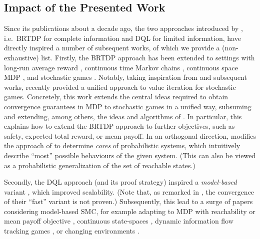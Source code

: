 \documentclass{theoretics}
\begin{document}
\subsection{Impact of the Presented Work} \label{sec:intro:influence}

Since its publications about a decade ago, the two approaches introduced by \cite{DBLP:conf/atva/BrazdilCCFKKPU14}, i.e.\ BRTDP for complete information and DQL for limited information, have directly inspired a number of subsequent works, of which we provide a (non-exhaustive) list.
Firstly, the BRTDP approach has been extended to settings with long-run average reward \cite{DBLP:conf/cav/AshokCDKM17}, continuous time Markov chains \cite{DBLP:conf/atva/AshokBHK18}, continuous space MDP \cite{DBLP:conf/concur/GroverKMW22}, and stochastic games \cite{DBLP:journals/iandc/EisentrautKKW22}.
Notably, taking inspiration from \cite{DBLP:conf/atva/BrazdilCCFKKPU14} and subsequent works, \cite{DBLP:conf/lics/KretinskyMW23} recently provided a unified approach to value iteration for stochastic games.
Concretely, this work extends the central ideas required to obtain convergence guarantees in MDP to stochastic games in a unified way, subsuming and extending, among others, the ideas and algorithms of \cite{DBLP:conf/atva/BrazdilCCFKKPU14,DBLP:conf/rp/HaddadM14,DBLP:conf/cav/AshokCDKM17,DBLP:journals/iandc/EisentrautKKW22}.
In particular, this explains how to extend the BRTDP approach to further objectives, such as safety, expected total reward, or mean payoff.
In an orthogonal direction, \cite{DBLP:journals/lmcs/KretinskyM20} modifies the approach of \cite{DBLP:conf/atva/BrazdilCCFKKPU14} to determine \emph{cores} of probabilistic systems, which intuitively describe \enquote{most} possible behaviours of the given system.
(This can also be viewed as a probabilistic generalization of the set of reachable states.)

Secondly, the DQL approach (and its proof strategy) inspired a \emph{model-based} variant \cite{DBLP:conf/cav/AshokKW19}, which improved scalability.
(Note that, as remarked in \cite[Appendix~D]{DBLP:conf/cav/AshokKW19}, the convergence of their \enquote{fast} variant is not proven.)
Subsequently, this lead to a surge of papers considering model-based SMC, for example adapting to MDP with reachability \cite{DBLP:conf/isola/AshokDKW20} or mean payoff objective \cite{DBLP:conf/cav/AgarwalGKM22}, continuous state-spaces \cite{DBLP:journals/jair/BadingsRAPPSJ23}, dynamic information flow tracking games \cite{DBLP:conf/cdc/WeiningerGMK21}, or changing environments \cite{DBLP:conf/nips/SuilenS0022}.
\end{document}
